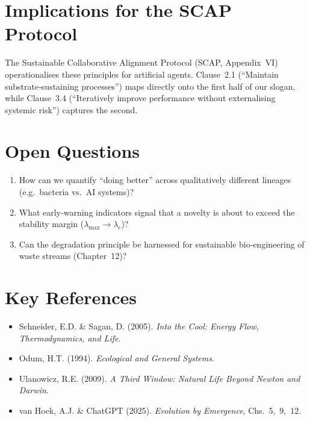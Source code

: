 \section*{Implications for the SCAP Protocol}
The Sustainable Collaborative Alignment Protocol (SCAP, Appendix VI) operationalises these principles for artificial agents.  Clause~2.1 (“Maintain substrate‑sustaining processes”) maps directly onto the first half of our slogan, while Clause~3.4 (“Iteratively improve performance without externalising systemic risk”) captures the second.

\section*{Open Questions}
\begin{enumerate}[label=\arabic*.]
  \item How can we quantify “doing better” across qualitatively different lineages (e.g.~bacteria vs.~AI systems)?
  \item What early‑warning indicators signal that a novelty is about to exceed the stability margin ($\lambda_{\max}\to\lambda_c$)?
  \item Can the degradation principle be harnessed for sustainable bio‑engineering of waste streams (Chapter 12)?
\end{enumerate}

\section*{Key References}
\begin{itemize}
  \item Schneider, E.D. \& Sagan, D. (2005). \emph{Into the Cool: Energy Flow, Thermodynamics, and Life}.
  \item Odum, H.T. (1994). \emph{Ecological and General Systems}.
  \item Ulanowicz, R.E. (2009). \emph{A Third Window: Natural Life Beyond Newton and Darwin}.
  \item van Hoek, A.J. \& ChatGPT (2025). \emph{Evolution by Emergence}, Chs.~5, 9, 12.
\end{itemize}

